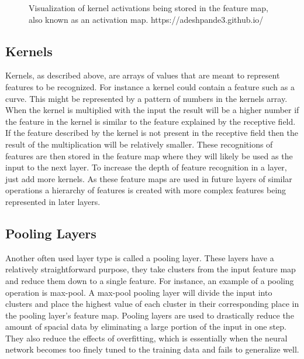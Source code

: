 \documentclass{sig-alternate}
\begin{document}
\begin{figure}
\centering
{}
\caption{Visualization of kernel activations being stored in the feature map, also known as an activation map. https://adeshpande3.github.io/}
\label{fig:ActivationMap}
\end{figure}

\subsection{Kernels}
\label{sec:kernels}

Kernels, as described above, are arrays of values that are meant to represent features to be recognized. For instance a kernel could contain a feature such as a curve. This might be represented by a pattern of numbers in the kernels array. When the kernel is multiplied with the input the result will be a higher number if the feature in the kernel is similar to the feature explained by the receptive field. If the feature described by the kernel is not present in the receptive field then the result of the multiplication will be relatively smaller. These recognitions of features are then stored in the feature map where they will likely be used as the input to the next layer. To increase the depth of feature recognition in a layer, just add more kernels. As these feature maps are used in future layers of similar operations a hierarchy of features is created with more complex features being represented in later layers.

\subsection{Pooling Layers}
\label{sec:poolingLayers}

Another often used layer type is called a pooling layer. These layers have a relatively straightforward purpose, they take clusters from the input feature map and reduce them down to a single feature. For instance, an example of a pooling operation is max-pool. A max-pool pooling layer will divide the input into clusters and place the highest value of each cluster in their corresponding place in the pooling layer's feature map. Pooling layers are used to drastically reduce the amount of spacial data by eliminating a large portion of the input in one step. They also reduce the effects of overfitting, which is essentially when the neural network becomes too finely tuned to the training data and fails to generalize well.
\end{document}
